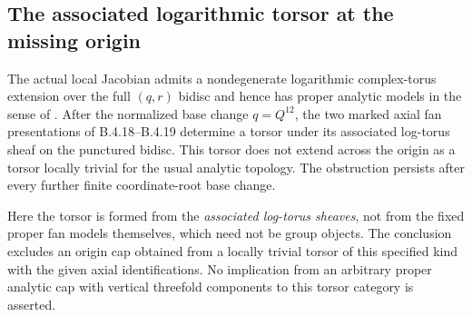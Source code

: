 \subsection{The associated logarithmic torsor at the missing origin}

\begin{proposition}\label{push:src:B.4.24}
\label{push:B424}
The actual local Jacobian admits a nondegenerate logarithmic
complex-torus extension over the full $(q,r)$ bidisc and hence
has proper analytic models in the sense of
\citet{KKN2008Root}. After the normalized base change
$q=Q^{12}$, the two marked axial fan presentations of
B.4.18--B.4.19 determine a torsor under its associated
log-torus sheaf on the punctured bidisc. This torsor does
not extend across the origin as a torsor locally trivial
for the usual analytic topology. The obstruction persists
after every further finite coordinate-root base change.

Here the torsor is formed from the \emph{associated
log-torus sheaves}, not from the fixed proper fan models
themselves, which need not be group objects. The conclusion
excludes an origin cap obtained from a locally trivial
torsor of this specified kind with the given axial
identifications. No implication from an arbitrary proper
analytic cap with vertical threefold components to this
torsor category is asserted.
\end{proposition}

